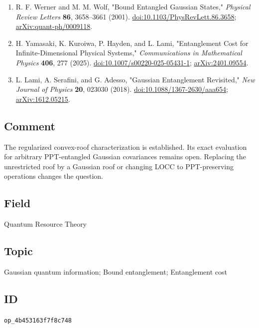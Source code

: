 \begin{enumerate}[label={},leftmargin=4.8em,labelsep=0.5em]
  \footnotesize
  \item[\textup{[WW01]}]\label{ref:ser15-1}
  R. F. Werner and M. M. Wolf, "Bound Entangled Gaussian States," \emph{Physical Review Letters} \textbf{86}, 3658--3661 (2001). \href{https://doi.org/10.1103/PhysRevLett.86.3658}{doi:10.1103/PhysRevLett.86.3658}; \href{https://arxiv.org/abs/quant-ph/0009118}{arXiv:quant-ph/0009118}.

  \item[\textup{[YKHL25]}]\label{ref:ser15-2}
  H. Yamasaki, K. Kuroiwa, P. Hayden, and L. Lami, "Entanglement Cost for Infinite-Dimensional Physical Systems," \emph{Communications in Mathematical Physics} \textbf{406}, 277 (2025). \href{https://doi.org/10.1007/s00220-025-05431-1}{doi:10.1007/s00220-025-05431-1}; \href{https://arxiv.org/abs/2401.09554}{arXiv:2401.09554}.

  \item[\textup{[LSA18]}]\label{ref:ser15-lami}
  L. Lami, A. Serafini, and G. Adesso, "Gaussian Entanglement Revisited," \emph{New Journal of Physics} \textbf{20}, 023030 (2018). \href{https://doi.org/10.1088/1367-2630/aaa654}{doi:10.1088/1367-2630/aaa654}; \href{https://arxiv.org/abs/1612.05215}{arXiv:1612.05215}.
\end{enumerate}

\subsection*{Comment}

The regularized convex-roof characterization is established. Its exact evaluation for arbitrary PPT-entangled Gaussian covariances remains open. Replacing the unrestricted roof by a Gaussian roof or changing LOCC to PPT-preserving operations changes the question.

\subsection*{Field}

Quantum Resource Theory

\subsection*{Topic}

Gaussian quantum information; Bound entanglement; Entanglement cost

\subsection*{ID}

\texttt{op\_4b453163f7f8c748}
